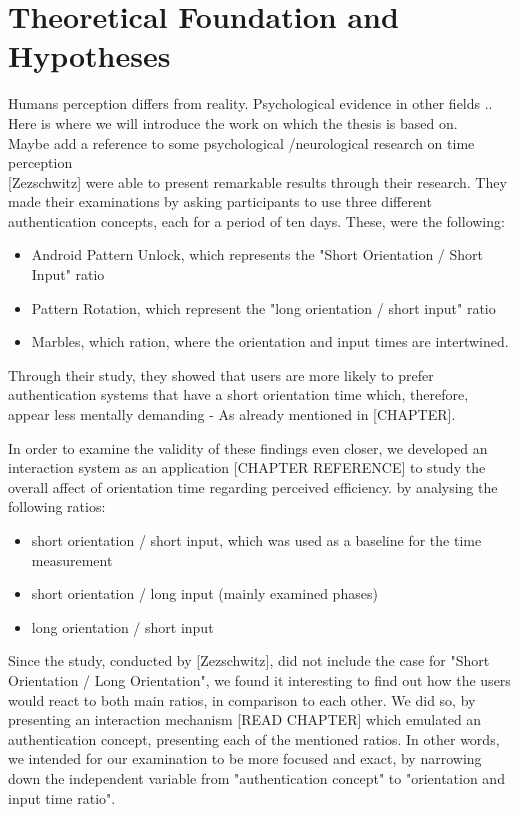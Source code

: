 
\chapter{Theoretical Foundation and Hypotheses}\label{ch:third}

Humans perception differs from reality. Psychological evidence in other fields ..\\

Here is where we will introduce the work on which the thesis is based on. \\
Maybe add a reference to some psychological /neurological research on time perception \\

[Zezschwitz] were able to present remarkable results through their research. They made their examinations by asking participants to use three different authentication concepts, each for a period of ten days. These, were the following: 

\begin{itemize}
    \item Android Pattern Unlock, which represents the "Short Orientation / Short Input" ratio
    \item Pattern Rotation, which represent the "long orientation / short input" ratio
    \item Marbles, which ration, where the orientation and input times are intertwined.
\end{itemize}

Through their study, they showed that users are more likely to prefer authentication systems that have a short orientation time which, therefore, appear less mentally demanding - As already mentioned in [CHAPTER].\par
In order to examine the validity of these findings even closer, we developed an interaction system as an application [CHAPTER REFERENCE] to study the overall affect of orientation time regarding perceived efficiency.  by analysing the following ratios: 

\begin{itemize}
    \item short orientation / short input, which was used as a baseline for the time measurement
    \item short orientation / long input (mainly examined phases)
    \item long orientation / short input
\end{itemize}

Since the study, conducted by [Zezschwitz], did not include the case for "Short Orientation / Long Orientation", we found it interesting to find out how the users would react to both main ratios, in comparison to each other. We did so, by presenting an interaction mechanism [READ CHAPTER] which emulated an authentication concept, presenting each of the mentioned ratios. In other words, we intended for our examination to be more focused and exact, by narrowing down the independent variable from "authentication concept" to "orientation and input time ratio".
